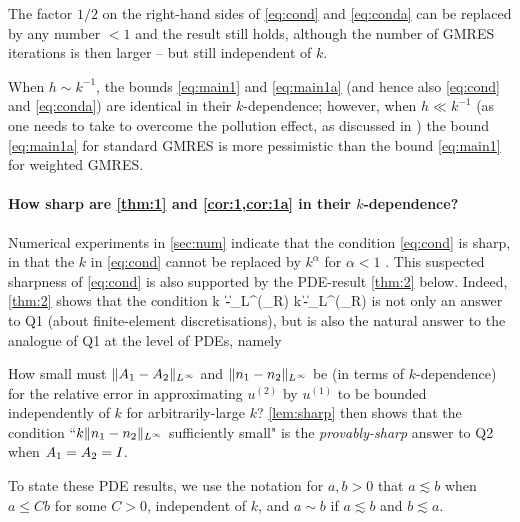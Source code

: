 The factor $1/2$ on the right-hand sides of \cref{eq:cond} and \cref{eq:conda} can be replaced by any number $<1$ and the result still holds, although the number of GMRES iterations is then larger -- but still independent of $k$.

\bre
When $h\sim  k^{-1}$, the bounds \cref{eq:main1} and \cref{eq:main1a} (and hence also \cref{eq:cond} and \cref{eq:conda}) are identical in their $k$-dependence; however, when $h\ll k^{-1}$ (as one needs to take to overcome the pollution effect, as discussed in ) the bound \cref{eq:main1a} for standard GMRES is more pessimistic than the bound \cref{eq:main1} for weighted GMRES.
\ere


\paragraph{How sharp are \cref{thm:1} and \cref{cor:1,cor:1a} in their $k$-dependence?}
Numerical experiments in \cref{sec:num} indicate that the condition \cref{eq:cond} is sharp, in that the $k$ in \cref{eq:cond} cannot be replaced by $k^\alpha$ for $\alpha<1$ . This suspected sharpness of \cref{eq:cond} is also supported by the PDE-result \cref{thm:2} below. Indeed, \cref{thm:2} %
 shows that the condition
\beqs
k\,
\big\|\Ao-\At\big\|_{L^\infty(\Omega_R)} \quad{} \quad k\,\big\|\no-\nt\big\|_{L^\infty(\Omega_R)}
\quad{}
\eeqs
is not only an answer to Q1 (about finite-element discretisations), but is also the natural answer to the analogue of Q1 at the level of PDEs, namely 
\bit
\item[Q2.]
How small must $\|A_{1} - A_{2}\|_{L^\infty}$ and 
$\|n_{1} - n_{2}\|_{L^\infty}$ be (in terms of $k$-dependence) for the relative error in approximating 
$u^{(2)}$ by $u^{(1)}$ to be bounded independently of $k$ for arbitrarily-large $k$? 
\eit
\cref{lem:sharp} then shows that the condition ``$k\|n_{1} - n_{2}\|_{L^\infty}$ sufficiently small" is the \emph{provably-sharp} answer to Q2 when $A_{1}= A_{2}= I$.

To state these PDE results, we use the notation for $a,b>0$ that $a\lesssim b$ when $a\leq C b$ for some $C>0$, independent of $k$, and $a\sim b$ if $a\lesssim b$ and $b\lesssim a$.


